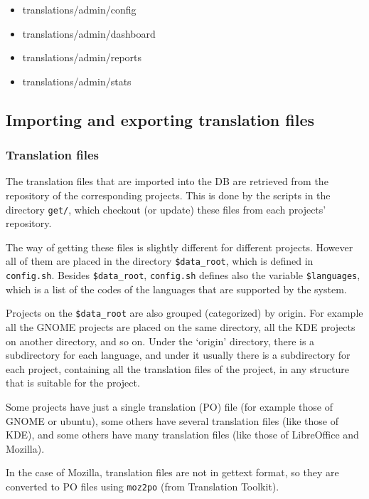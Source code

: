 \documentclass[11pt]{article}
\begin{document}
\begin{itemize}
\item translations/admin/config
\item translations/admin/dashboard
\item translations/admin/reports
\item translations/admin/stats
\end{itemize}
\subsection{Importing and exporting translation files}
\label{sec-8.4}


\subsubsection{Translation files}
\label{sec-8.4.1}


    The translation files that are imported into the DB are retrieved
    from the repository of the corresponding projects. This is done by
    the scripts in the directory \texttt{get/}, which checkout (or update)
    these files from each projects' repository.

    The way of getting these files is slightly different for different
    projects. However all of them are placed in the directory
    \texttt{\$data\_root}, which is defined in \texttt{config.sh}. Besides \texttt{\$data\_root},
    \texttt{config.sh} defines also the variable \texttt{\$languages}, which is a list
    of the codes of the languages that are supported by the system.

    Projects on the \texttt{\$data\_root} are also grouped (categorized) by
    origin.  For example all the GNOME projects are placed on the same
    directory, all the KDE projects on another directory, and so on.
    Under the `origin' directory, there is a subdirectory for each
    language, and under it usually there is a subdirectory for each
    project, containing all the translation files of the project, in
    any structure that is suitable for the project.

    Some projects have just a single translation (PO) file (for example
    those of GNOME or ubuntu), some others have several translation
    files (like those of KDE), and some others have many translation
    files (like those of LibreOffice and Mozilla).

    In the case of Mozilla, translation files are not in gettext format,
    so they are converted to PO files using \texttt{moz2po} (from Translation
    Toolkit).
\end{document}
